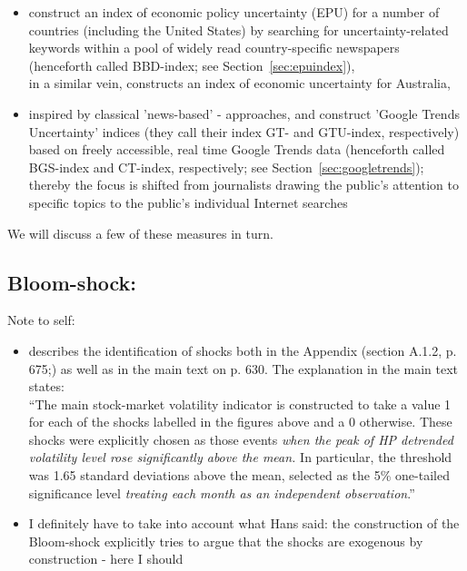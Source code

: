 \documentclass[a4paper,12pt,oneside,pointednumbers,bibtotoc,bigheadings,liststotoc]{scrbook}
\begin{document}
\begin{itemize}
\begin{itemize}
\begin{itemize}
				\item \citet{bakeretal:15} construct an index of economic policy uncertainty (EPU) for a number of countries (including the United States) by searching for uncertainty-related keywords within a pool of widely read country-specific newspapers (henceforth called BBD-index; see Section~\ref{sec:epuindex}),\\
			in a similar vein, \citet{moore:17} constructs an index of economic uncertainty for Australia,
				\item inspired by classical 'news-based' - approaches, \citet{bontempietal:16} and \citet{castelnuovoandtran:17} construct 'Google Trends Uncertainty' indices (they call their index GT- and GTU-index, respectively) based on freely accessible, real time Google Trends data (henceforth called BGS-index and CT-index, respectively; see Section~\ref{sec:googletrends}); thereby the focus is shifted from journalists drawing the public's attention to specific topics to the public's individual Internet searches
			\end{itemize}
		\end{itemize}
\end{itemize} 

We will discuss a few of these measures in turn.


\subsection{Bloom-shock: \citet{bloom:09}}
\label{sec:bloomshock}
\begingroup
    \fontsize{8pt}{12pt}\selectfont
    Note to self:
\begin{itemize}
	\item  \citet{bloom:09} describes the identification of shocks both in the Appendix (section A.1.2, p. 675;) as well as in the main text on p. 630. The explanation in the main text states:\\
``The main stock-market volatility indicator is constructed to take a value 1 for each of the shocks labelled in the figures above and a 0 otherwise. These shocks were explicitly chosen as those events \textit{when the peak of HP detrended volatility level rose significantly above the mean.} In particular, the threshold was 1.65 standard deviations above the mean, selected as the 5\% one-tailed significance level \textit{treating each month as an independent observation}.''
	\item I definitely have to take into account what Hans said: the construction of the Bloom-shock explicitly tries to argue that the shocks are exogenous by construction - here I should 
\end{itemize}
\endgroup
\end{document}
